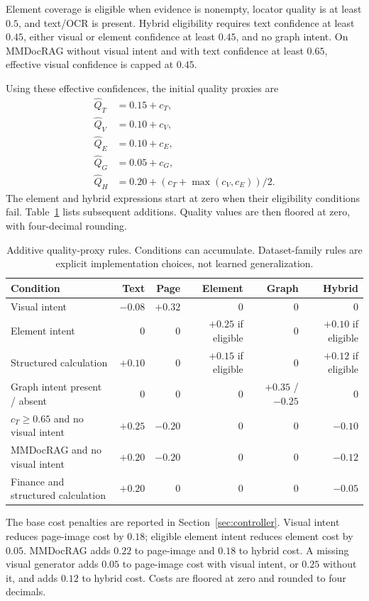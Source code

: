 Element coverage is eligible when evidence is nonempty, locator quality is at least $0.5$, and text/OCR is present. Hybrid eligibility requires text confidence at least $0.45$, either visual or element confidence at least $0.45$, and no graph intent. On MMDocRAG without visual intent and with text confidence at least $0.65$, effective visual confidence is capped at $0.45$.

Using these effective confidences, the initial quality proxies are
\begin{align*}
 \widehat Q_T&=0.15+c_T,\\
 \widehat Q_V&=0.10+c_V,\\
 \widehat Q_E&=0.10+c_E,\\
 \widehat Q_G&=0.05+c_G,\\
 \widehat Q_H&=0.20+(c_T+\max(c_V,c_E))/2.
\end{align*}
The element and hybrid expressions start at zero when their eligibility conditions fail. Table~\ref{tab:quality-rules} lists subsequent additions. Quality values are then floored at zero, with four-decimal rounding.

\begin{table}[t]
\centering
\small
\begin{tabularx}{\textwidth}{@{}Xrrrrr@{}}
\toprule
Condition & Text & Page & Element & Graph & Hybrid \\
\midrule
Visual intent & $-0.08$ & $+0.32$ & 0 & 0 & 0 \\
Element intent & 0 & 0 & $+0.25$ if eligible & 0 & $+0.10$ if eligible \\
Structured calculation & $+0.10$ & 0 & $+0.15$ if eligible & 0 & $+0.12$ if eligible \\
Graph intent present / absent & 0 & 0 & 0 & $+0.35$ / $-0.25$ & 0 \\
$c_T\geq0.65$ and no visual intent & $+0.25$ & $-0.20$ & 0 & 0 & $-0.10$ \\
MMDocRAG and no visual intent & $+0.20$ & $-0.20$ & 0 & 0 & $-0.12$ \\
Finance and structured calculation & $+0.20$ & 0 & 0 & 0 & $-0.05$ \\
\bottomrule
\end{tabularx}
\caption{Additive quality-proxy rules. Conditions can accumulate. Dataset-family rules are explicit implementation choices, not learned generalization.}
\label{tab:quality-rules}
\end{table}

The base cost penalties are reported in Section~\ref{sec:controller}. Visual intent reduces page-image cost by $0.18$; eligible element intent reduces element cost by $0.05$. MMDocRAG adds $0.22$ to page-image and $0.18$ to hybrid cost. A missing visual generator adds $0.05$ to page-image cost with visual intent, or $0.25$ without it, and adds $0.12$ to hybrid cost. Costs are floored at zero and rounded to four decimals.

